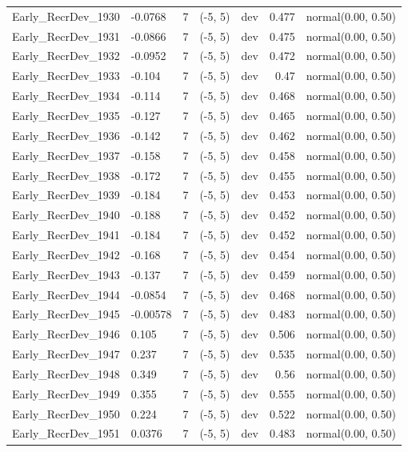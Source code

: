 \documentclass[
]{scrartcl}
\begin{document}
\begin{longtable}{llrllrl}
Early\_RecrDev\_1930 & -0.0768 & 7 & (-5, 5) & dev & 0.477 & normal(0.00, 0.50) \\ 
Early\_RecrDev\_1931 & -0.0866 & 7 & (-5, 5) & dev & 0.475 & normal(0.00, 0.50) \\ 
Early\_RecrDev\_1932 & -0.0952 & 7 & (-5, 5) & dev & 0.472 & normal(0.00, 0.50) \\ 
Early\_RecrDev\_1933 & -0.104 & 7 & (-5, 5) & dev & 0.47 & normal(0.00, 0.50) \\ 
Early\_RecrDev\_1934 & -0.114 & 7 & (-5, 5) & dev & 0.468 & normal(0.00, 0.50) \\ 
Early\_RecrDev\_1935 & -0.127 & 7 & (-5, 5) & dev & 0.465 & normal(0.00, 0.50) \\ 
Early\_RecrDev\_1936 & -0.142 & 7 & (-5, 5) & dev & 0.462 & normal(0.00, 0.50) \\ 
Early\_RecrDev\_1937 & -0.158 & 7 & (-5, 5) & dev & 0.458 & normal(0.00, 0.50) \\ 
Early\_RecrDev\_1938 & -0.172 & 7 & (-5, 5) & dev & 0.455 & normal(0.00, 0.50) \\ 
Early\_RecrDev\_1939 & -0.184 & 7 & (-5, 5) & dev & 0.453 & normal(0.00, 0.50) \\ 
Early\_RecrDev\_1940 & -0.188 & 7 & (-5, 5) & dev & 0.452 & normal(0.00, 0.50) \\ 
Early\_RecrDev\_1941 & -0.184 & 7 & (-5, 5) & dev & 0.452 & normal(0.00, 0.50) \\ 
Early\_RecrDev\_1942 & -0.168 & 7 & (-5, 5) & dev & 0.454 & normal(0.00, 0.50) \\ 
Early\_RecrDev\_1943 & -0.137 & 7 & (-5, 5) & dev & 0.459 & normal(0.00, 0.50) \\ 
Early\_RecrDev\_1944 & -0.0854 & 7 & (-5, 5) & dev & 0.468 & normal(0.00, 0.50) \\ 
Early\_RecrDev\_1945 & -0.00578 & 7 & (-5, 5) & dev & 0.483 & normal(0.00, 0.50) \\ 
Early\_RecrDev\_1946 & 0.105 & 7 & (-5, 5) & dev & 0.506 & normal(0.00, 0.50) \\ 
Early\_RecrDev\_1947 & 0.237 & 7 & (-5, 5) & dev & 0.535 & normal(0.00, 0.50) \\ 
Early\_RecrDev\_1948 & 0.349 & 7 & (-5, 5) & dev & 0.56 & normal(0.00, 0.50) \\ 
Early\_RecrDev\_1949 & 0.355 & 7 & (-5, 5) & dev & 0.555 & normal(0.00, 0.50) \\ 
Early\_RecrDev\_1950 & 0.224 & 7 & (-5, 5) & dev & 0.522 & normal(0.00, 0.50) \\ 
Early\_RecrDev\_1951 & 0.0376 & 7 & (-5, 5) & dev & 0.483 & normal(0.00, 0.50) \\ 

\end{longtable}
\end{document}
